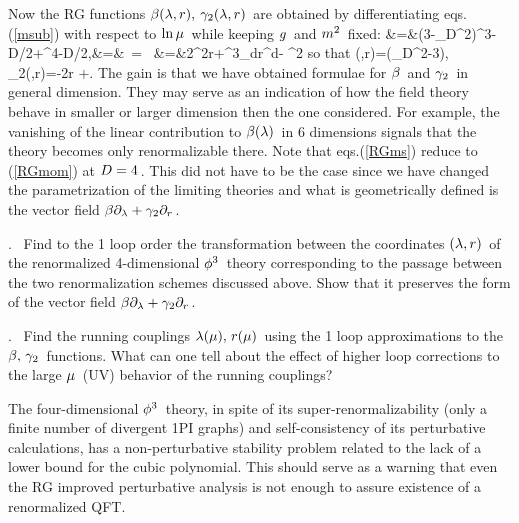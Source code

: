 Now the RG functions \s$\beta(\la,r),\s\m\gamma_2(\la,r)\s$
are obtained by differentiating eqs.\s\s(\ref{msub})
with respect to \s$\ln{\mu}\hspace{0.05cm}$
while keeping \s$g\hspace{0.05cm}$ and \s$m^2\hspace{0.05cm}$ fixed:
&=&(3-{_D\over^2})\m\mu^{3-D/2}\m\la\s+\s\mu^{4-D/2}\s,&=&\s[\m\mu^2\m r\s+\s\hh\s{_{\mu^2\m\la^2}
\over^{16\pi^2(4-D)}}\m]\ =\
\s[\m\mu^2\m r\s+\s\hh\s{_{\mu^{D-4}\m g^2}
\over^{16\pi^2(4-D)}}\m]\cr
&=&2\m\mu^2\m r\s+\s\mu^3{_{d\m r}\over^{d\mu}}\s-\s\hh
\s\mu^2
\non
\qqq
so that
\qq
\beta(\la,r)\s=\s({_D\over^2}-3)\m\la\s,
\quad\quad\gamma_2(\la,r)\s=\s-2r\s
+\s\hh{}\s.
\label{RGms}
\qqq
The gain is that we have obtained formulae for
\s$\beta\hspace{0.05cm}$ and \s$\gamma_2\hspace{0.05cm}$ in general dimension.
They may serve as an indication of how the field
theory behave in smaller or larger dimension
then the one considered. For example, the vanishing of
the linear contribution to \s$\beta(\lambda)\hspace{0.05cm}$ in 6 dimensions
signals that the theory becomes only renormalizable there.
Note that eqs.\s\s(\ref{RGms})
reduce to (\ref{RGmom}) at \s$D=4\hspace{0.05cm}$. \s This did
not have to be the case since we have changed the parametrization
of the limiting theories and what is geometrically defined
is the vector field \s$\beta\partial_\lambda+\gamma_2\partial_r\hspace{0.05cm}$.
\vskip 0.6cm

. \ Find to the 1 loop order the transformation
between the coordinates \s$(\lambda,r)\hspace{0.05cm}$ of the renormalized
4-dimensional \s$\phi^3\hspace{0.05cm}$ theory corresponding to
the passage between the two renormalization schemes
discussed above. Show that it preserves the form
of the vector field \s$\beta\partial_\lambda+\gamma_2\partial_r\hspace{0.05cm}$.
\vskip 0.6cm

. \ Find the running couplings \s$\lambda(\mu),\hspace{0.05cm} r(\mu)\hspace{0.05cm}$
using the 1 loop approximations to the \s$\beta,\hspace{0.05cm}\gamma_2\hspace{0.05cm}$
functions. What can one tell about the effect of higher loop
corrections to the large \s$\mu\hspace{0.05cm}$ (UV) behavior of the running
couplings?
\vskip 0.6cm

\no The four-dimensional \s$\phi^3\hspace{0.05cm}$ theory, in spite of its
super-renormalizability (only a finite number of divergent
1PI graphs) and self-consistency of its perturbative calculations,
has a non-perturbative stability problem related to the
lack of a lower bound for the cubic polynomial. This
should serve as a warning that even the RG improved
perturbative analysis is not enough to assure existence
of a renormalized QFT.
\vskip 1.2cm


\vskip 0.5cm

